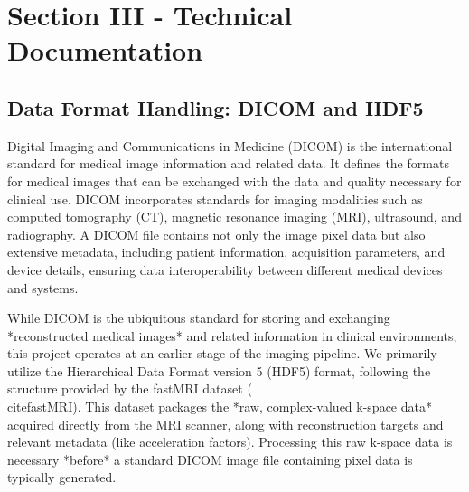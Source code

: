 \documentclass[
	letterpaper, %
]{jdf}
\begin{document}


\clearpage

\section{Section III - Technical Documentation}

\subsection{Data Format Handling: DICOM and HDF5}

Digital Imaging and Communications in Medicine (DICOM) is the international standard for medical image information and related data. It defines the formats for medical images that can be exchanged with the data and quality necessary for clinical use. DICOM incorporates standards for imaging modalities such as computed tomography (CT), magnetic resonance imaging (MRI), ultrasound, and radiography. A DICOM file contains not only the image pixel data but also extensive metadata, including patient information, acquisition parameters, and device details, ensuring data interoperability between different medical devices and systems.

While DICOM is the ubiquitous standard for storing and exchanging *reconstructed medical images* and related information in clinical environments, this project operates at an earlier stage of the imaging pipeline. We primarily utilize the Hierarchical Data Format version 5 (HDF5) format, following the structure provided by the fastMRI dataset (\\cite{fastMRI}). This dataset packages the *raw, complex-valued k-space data* acquired directly from the MRI scanner, along with reconstruction targets and relevant metadata (like acceleration factors). Processing this raw k-space data is necessary *before* a standard DICOM image file containing pixel data is typically generated.
\end{document}
